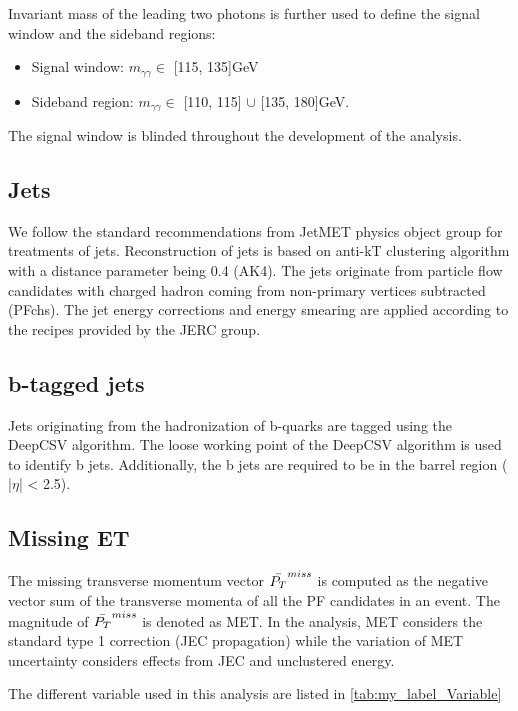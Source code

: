 Invariant mass of the leading two photons is further used to define the signal window and the sideband regions:
\begin{itemize}
    \item Signal window: $m_{\gamma\gamma} \in$ [115, 135]GeV
    \item Sideband region: $m_{\gamma\gamma} \in$ [110, 115] $\cup$ [135, 180]GeV.
\end{itemize}
The signal window is blinded throughout the development of the analysis.

\subsection{Jets}

We follow the standard recommendations from JetMET physics object group for treatments of jets. Reconstruction of jets is based on anti-kT clustering algorithm \cite{Cacciari_2008} with a distance parameter being 0.4 (AK4). The jets originate from particle flow candidates with charged hadron coming from non-primary vertices subtracted (PFchs). The jet energy corrections and energy smearing are applied according to the recipes provided by the JERC group\cite{CrossSection_5}.

\subsection{b-tagged jets}
Jets originating from the hadronization of b-quarks are tagged using the DeepCSV algorithm. The loose working point of the DeepCSV algorithm is used to identify b jets. Additionally, the b jets are required to be in the barrel region ( |$\eta$| < 2.5). 


\subsection{Missing ET}
The missing transverse momentum vector $\Bar{P_T}^ {miss}$ is computed as the negative vector sum of the transverse momenta of all the PF candidates in an event. The magnitude of $\Bar{P_T}^ {miss}$ is denoted as MET. In the analysis, MET considers the standard type 1 correction (JEC propagation) while the variation of MET uncertainty considers effects from JEC and unclustered energy.

The different variable used in this analysis are listed in \autoref{tab:my_label_Variable}

